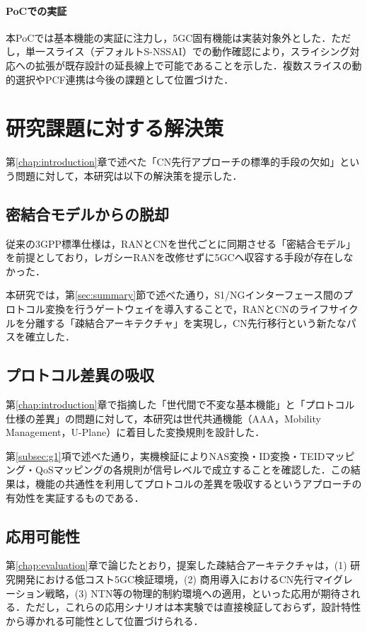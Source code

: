 \paragraph{PoCでの実証}
本PoCでは基本機能の実証に注力し，5GC固有機能は実装対象外とした．ただし，単一スライス（デフォルトS-NSSAI）での動作確認により，スライシング対応への拡張が既存設計の延長線上で可能であることを示した．複数スライスの動的選択やPCF連携は今後の課題として位置づけた．

\section{研究課題に対する解決策}
第\ref{chap:introduction}章で述べた「CN先行アプローチの標準的手段の欠如」という問題に対して，本研究は以下の解決策を提示した．

\subsection{密結合モデルからの脱却}
従来の3GPP標準仕様は，RANとCNを世代ごとに同期させる「密結合モデル」を前提としており，レガシーRANを改修せずに5GCへ収容する手段が存在しなかった．

本研究では，第\ref{sec:summary}節で述べた通り，S1/NGインターフェース間のプロトコル変換を行うゲートウェイを導入することで，RANとCNのライフサイクルを分離する「疎結合アーキテクチャ」を実現し，CN先行移行という新たなパスを確立した．

\subsection{プロトコル差異の吸収}
第\ref{chap:introduction}章で指摘した「世代間で不変な基本機能」と「プロトコル仕様の差異」の問題に対して，本研究は世代共通機能（AAA，Mobility Management，U-Plane）に着目した変換規則を設計した．

第\ref{subsec:g1}項で述べた通り，実機検証によりNAS変換・ID変換・TEIDマッピング・QoSマッピングの各規則が信号レベルで成立することを確認した．この結果は，機能の共通性を利用してプロトコルの差異を吸収するというアプローチの有効性を実証するものである．

\subsection{応用可能性}
第\ref{chap:evaluation}章で論じたとおり，提案した疎結合アーキテクチャは，(1) 研究開発における低コスト5GC検証環境，(2) 商用導入におけるCN先行マイグレーション戦略，(3) NTN等の物理的制約環境への適用，といった応用が期待される．ただし，これらの応用シナリオは本実験では直接検証しておらず，設計特性から導かれる可能性として位置づけられる．

